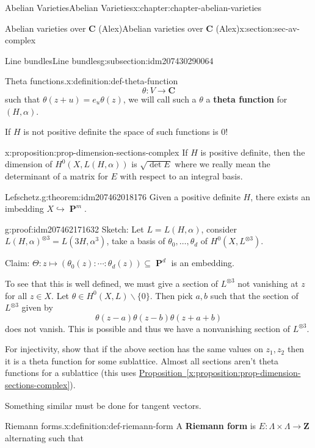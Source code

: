 \documentclass[oneside,10pt,]{book}
\newcommand{\terminology}[1]{\textbf{#1}}
\numberwithin{equation}{section}
\newcommand{\ZZ}{\mathbf{Z}}
\newcommand{\CC}{\mathbf{C}}
\DeclareMathOperator{\PP}{\mathbf{P}}
\begin{document}
\begin{chapterptx}{Abelian Varieties}{}{Abelian Varieties}{}{}{x:chapter:chapter-abelian-varieties}
\begin{sectionptx}{Abelian varieties over \(\CC\) (Alex)}{}{Abelian varieties over \(\CC\) (Alex)}{}{}{x:section:sec-av-complex}
\begin{subsectionptx}{Line bundles}{}{Line bundles}{}{}{g:subsection:idm207430290064}
\begin{definition}{Theta functions.}{x:definition:def-theta-function}
\begin{equation*}
\theta \colon V \to \CC
\end{equation*}
such that \(\theta(z+ u) = e_u \theta(z)\), we will call such a \(\theta\) a \terminology{theta function} for \((H,\alpha)\).%
\end{definition}
If \(H\) is not positive definite the space of such functions is 0!%
\begin{proposition}{}{}{x:proposition:prop-dimension-sections-complex}%
If \(H\) is positive definite, then the dimension of \(H^0(X, L(H,\alpha))\) is \(\sqrt{\det E}\) where we really mean the determinant of a matrix for \(E\) with respect to an integral basis.%
\end{proposition}
\begin{theorem}{Lefschetz.}{}{g:theorem:idm207462018176}%
Given a positive definite \(H\), there exists an imbedding \(X \hookrightarrow \PP^m\).%
\end{theorem}
\begin{proofptx}{}{g:proof:idm207462171632}
Sketch: Let \(L = L(H,\alpha)\), consider \(L(H,\alpha)^{\otimes 3} = L(3H, \alpha^3)\), take a basis of \(\theta_0,\ldots, \theta_d\) of \(H^0(X, L^{\otimes 3})\).%
\par
Claim: \(\Theta\colon z\mapsto (\theta_0(z) :\cdots :\theta_d (z)) \subseteq \PP^d\) is an embedding.%
\par
To see that this is well defined, we must give a section of \(L^{\otimes 3}\) not vanishing at \(z\) for all \(z\in X\). Let \(\theta \in H^0(X,L)\smallsetminus \{0\}\). Then pick \(a,b\) such that the section of \(L^{\otimes 3}\) given by%
\begin{equation*}
\theta(z-a)\theta(z-b) \theta(z+ a+b)
\end{equation*}
does not vanish. This is possible and thus we have a nonvanishing section of \(L^{\otimes 3}\).%
\par
For injectivity, show that if the above section has the same values on \(z_1,z_2\) then it is a theta function for some sublattice. Almost all sections aren't theta functions for a sublattice (this uses \hyperref[x:proposition:prop-dimension-sections-complex]{Proposition~\ref{x:proposition:prop-dimension-sections-complex}}).%
\par
Something similar must be done for tangent vectors.%
\end{proofptx}
\begin{definition}{Riemann forms.}{x:definition:def-riemann-form}%
A \terminology{Riemann form} is \(E\colon \Lambda \times \Lambda \to \ZZ\) alternating such that%

\end{definition}
\end{subsectionptx}
\end{sectionptx}
\end{chapterptx}
\end{document}
